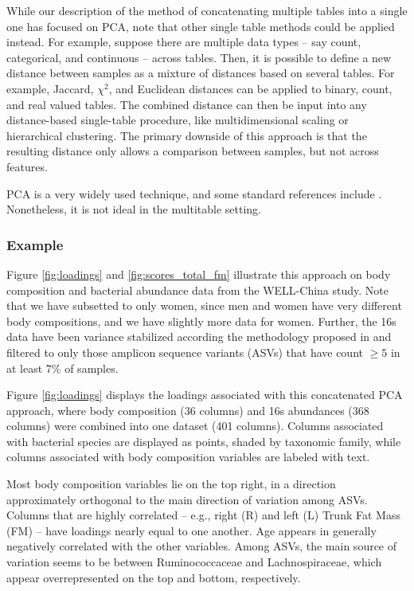 \documentclass[14pt]{extarticle}
\begin{document}
While our description of the method of concatenating multiple tables into a
single one has focused on PCA, note that other single table methods could be
applied instead. For example, suppose there are multiple data types -- say
count, categorical, and continuous -- across tables. Then, it is possible to
define a new distance between samples as a mixture of distances based on several
tables. For example, Jaccard, $\chi^{2}$, and Euclidean distances can be applied
to binary, count, and real valued tables. The combined distance can then be
input into any distance-based single-table procedure, like multidimensional
scaling or hierarchical clustering. The primary downside of this approach is
that the resulting distance only allows a comparison between samples, but not
across features.

PCA is a very widely used technique, and some standard references include
\citep{friedman2001elements, mardia1980multivariate, pages2014multiple}.
Nonetheless, it is not ideal in the multitable setting.

\subsubsection{Example}
\label{subsubsec:pca_example}

Figure \ref{fig:loadings} and \ref{fig:scores_total_fm} illustrate this approach
on body composition and bacterial abundance data from the WELL-China study. Note
that we have subsetted to only women, since men and women have very different
body compositions, and we have slightly more data for women. Further, the 16s
data have been variance stabilized according the methodology proposed in
\citep{Anders2010} and filtered to only those amplicon sequence variants (ASVs)
that have count $\geq 5$ in at least 7\% of samples.

Figure \ref{fig:loadings} displays the loadings associated with this
concatenated PCA approach, where body composition (36 columns) and 16s
abundances (368 columns) were combined into one dataset (401 columns). Columns
associated with bacterial species are displayed as points, shaded by taxonomic
family, while columns associated with body composition variables are labeled
with text.

Most body composition variables lie on the top right, in a direction
approximately orthogonal to the main direction of variation among ASVs. Columns
that are highly correlated -- e.g., right (R) and left (L) Trunk Fat Mass (FM) --
have loadings nearly equal to one another. Age appears in generally negatively
correlated with the other variables. Among ASVs, the main
source of variation seems to be between Ruminococcaceae and Lachnospiraceae,
which appear overrepresented on the top and bottom, respectively.
\end{document}
